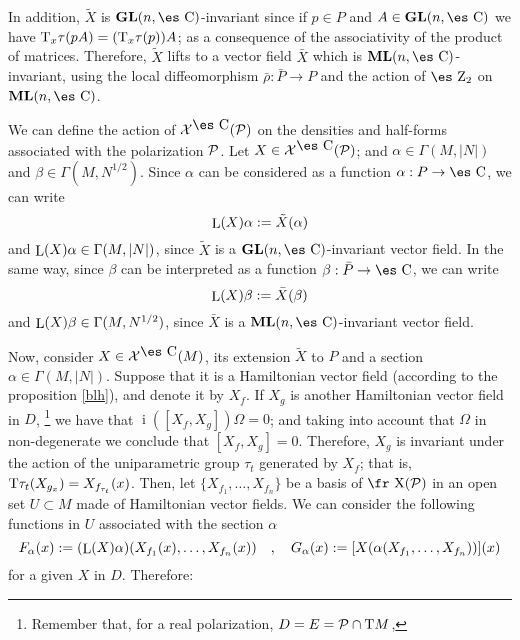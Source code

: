 \documentclass[12pt]{article}
\theoremstyle{plain}
\def\vf{\mbox{\fr X}}
\def\P{{\cal P}}
\def\GL{{\bf GL}(n,\Complex )}
\def\ML{{\bf ML}(n,\Complex )}
\def\Zahl{\mbox{\es Z}}
\def\Complex{\mbox{\es C}}
\def\inn{\mathop{i}\nolimits}
\def\Tan{{\rm T}}
\def\Lie{\mathop{\rm L}\nolimits}
\begin{document}
 In addition, $\tilde X$ is $\GL$-invariant since
 if $p \in P$ and $A \in\GL$ we have
$\Tan_x \tau (pA) = (\Tan_x \tau (p))A$;
as a consequence of the associativity of the product of matrices.
Therefore, $\tilde X$ lifts to a vector field $\bar X$ which is
$\ML$-invariant,
using the local diffeomorphism $\bar\rho:\bar P \to P$
and the action of $\Zahl_2$ on $\ML$.

We can define the action of ${\cal X}^{\Complex}({\cal P})$ on the
densities and half-forms
associated with the polarization ${\cal P}$.
Let $X \in {\cal X}^{\Complex}({\cal P})$; and
$\alpha \in \Gamma (M,| N | )$ and $\beta \in \Gamma (M,N^{1/2})$.
Since $\alpha$ can be considered as a function $\alpha : P \to
\Complex$, we can write
$$
\Lie(X)\alpha:=\tilde X(\alpha )
$$
and $\Lie(X)\alpha \in \Gamma (M,| N | )$,
since $\tilde X$ is a $\GL$-invariant vector field.
In the same way, since $\beta$ can be interpreted as a function
$\beta :\bar P \to \Complex$, we can write
$$
\Lie(X)\beta :=\bar X(\beta )
$$
and $\Lie(X)\beta \in \Gamma (M,N^{1/2})$,
since $\bar X$ is a $\ML$-invariant vector field.

Now, consider $X \in {\cal X}^{\Complex}(M)$, its extension $\tilde X$
to $P$ and
a section $\alpha\in\Gamma (M,| N | )$.
Suppose that it is a Hamiltonian vector field (according to the
proposition \ref{blh}),
and denote it by $X_f$.
If $X_g$ is another Hamiltonian vector field in $D$,%
\footnote{
Remember that, for a real polarization, $D=E=\P\cap\Tan M$,
}
we have that
$\inn([X_f,X_g])\Omega =0$;
and taking into account that $\Omega$ in non-degenerate
we conclude that $[X_f,X_g]=0$.
Therefore, $X_g$ is invariant under the action
of the uniparametric group $\tau_t$ generated by $X_f$;
that is, $\Tan\tau_t(X_{g_x})=X_{f_{\tau_t}}(x)$.
Then, let $\{ X_{f_1},\ldots ,X_{f_n}\}$ be
a basis of $\vf ({\cal P})$ in an open set $U \subset M$
made of Hamiltonian vector fields.
We can consider the following functions in $U$
associated with the section $\alpha$
$$
F_{\alpha}(x) := (\Lie(X)\alpha )(X_{f_1}(x),\ldots ,X_{f_n}(x))
\quad , \quad
G_{\alpha}(x) := [X(\alpha(X_{f_1},\ldots ,X_{f_n}))](x)
$$
for a given $X$ in $D$. Therefore:
\end{document}
